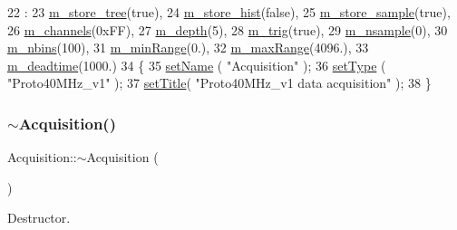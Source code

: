 \begin{DoxyCode}
22                            :
23   \hyperlink{classAcquisition_aca2143e9135e25554e58327475a767c5}{m\_store\_tree}(\textcolor{keyword}{true}),
24   \hyperlink{classAcquisition_a08f70edd83751dbdab4c8190dc4b9188}{m\_store\_hist}(\textcolor{keyword}{false}),
25   \hyperlink{classAcquisition_a987cc1d04007cf1f5acc1accfd0909e5}{m\_store\_sample}(\textcolor{keyword}{true}),
26   \hyperlink{classAcquisition_aedc8b29f322ef00540797fbd0d5112d1}{m\_channels}(0xFF),
27   \hyperlink{classAcquisition_a26628424533a2dd74d24712a14637a72}{m\_depth}(5),
28   \hyperlink{classAcquisition_a953bdc1bf56206b6df33b648af32a24f}{m\_trig}(\textcolor{keyword}{true}),
29   \hyperlink{classAcquisition_a26d0f1a44309ffac49c365b7ee568ab2}{m\_nsample}(0),
30   \hyperlink{classAcquisition_a05bccdc4b9ada37beaeba8794ccef12d}{m\_nbins}(100),
31   \hyperlink{classAcquisition_a06b3ea027ebdcb15f64a6517ceb99b76}{m\_minRange}(0.),
32   \hyperlink{classAcquisition_a45478629e9db582470b4b158edb46616}{m\_maxRange}(4096.),
33   \hyperlink{classAcquisition_a5f7fe20506e7d860ed61935255adfe17}{m\_deadtime}(1000.)
34 \{
35   \hyperlink{classObject_ae30fea75683c2d149b6b6d17c09ecd0c}{setName} ( \textcolor{stringliteral}{"Acquisition"} );
36   \hyperlink{classObject_aae534cc9d982bcb9b99fd505f2e103a5}{setType} ( \textcolor{stringliteral}{"Proto40MHz\_v1"} );
37   \hyperlink{classObject_a89557dbbad5bcaa02652f5d7fa35d20f}{setTitle}( \textcolor{stringliteral}{"Proto40MHz\_v1 data acquisition"} );
38 \}
\end{DoxyCode}
\mbox{\label{classAcquisition_a3b0205ba385e2da70abb5a351c4dbf0f}} 
\subsubsection{\texorpdfstring{$\sim$\+Acquisition()}{~Acquisition()}\hspace{0.1cm}{\footnotesize\ttfamily [1/2]}}
{\footnotesize\ttfamily Acquisition\+::$\sim$\+Acquisition (\begin{DoxyParamCaption}{ }\end{DoxyParamCaption})\hspace{0.3cm}{\ttfamily [virtual]}}



Destructor. 



